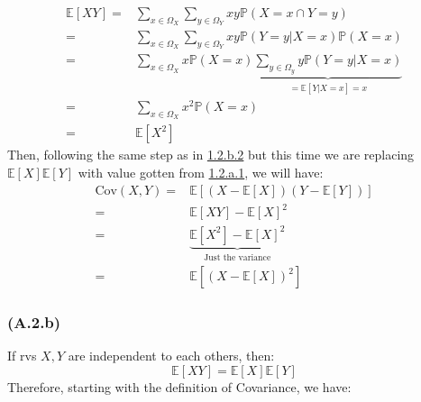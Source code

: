 \documentclass[]{article}
\begin{document}
            \begin{align*}\tag{1.2.a.1}\label{eqn:1.2.a.1}
                \mathbb{E}\left[XY\right] = 
                &\sum_{x\in\Omega_X}^{}
                    \sum_{y\in\Omega_Y}^{}
                        xy \mathbb{P}\left(X = x \cap Y = y\right)
                \\
                =&\sum_{x\in\Omega_X}^{}
                    \sum_{y\in\Omega_Y}^{}
                        xy \mathbb{P}\left(Y = y|X = x\right)\mathbb{P}\left(X = x\right)
                \\
                =&  \sum_{x\in\Omega_X}^{}
                    x \mathbb{P}\left(X = x\right)
                        \underbrace{
                            \sum_{y\in\Omega_y}^{}
                            y \mathbb{P}\left(Y = y|X = x\right)
                        }_
                        {=\mathbb{E}\left[Y| X = x\right] = x}
                \\
                =&  \sum_{x\in\Omega_X}^{}
                    x^2 \mathbb{P}\left(X = x\right)
                \\
                =& \mathbb{E}\left[X^2\right]
            \end{align*}
            Then, following the same step as in \hyperref[eqn:1.2.b.1]{1.2.b.2} but this time we are replacing $\mathbb{E}\left[X\right]\mathbb{E}\left[Y\right]$ with value gotten from \hyperref[eqn:1.2.a.1]{1.2.a.1}, we will have: 
            \begin{align*}\tag{1.2.a.2}\label{eqn:1.2.a.2}
                \text{Cov}(X, Y) =& \mathbb{E}\left[(X - \mathbb{E}\left[X\right])
                    ( Y - \mathbb{E}\left[Y\right])
                \right]
                \\
                =& 
                \mathbb{E}\left[XY\right] - \mathbb{E}\left[X\right]^2
                \\
                =&
                \underbrace
                {\mathbb{E}\left[X^2\right] - \mathbb{E}\left[X\right]^2}_
                {\text{Just the variance}}
                \\
                =&
                \mathbb{E}\left[(X - \mathbb{E}\left[X\right])^2\right]
            \end{align*}

        \subsubsection*{(A.2.b)}
            If rvs $X,Y$ are independent to each others, then: 
            \begin{equation*}\tag{1.2.b.1}\label{eqn:1.2.b.1}
                \mathbb{E}\left[XY\right] = \mathbb{E}\left[X\right]\mathbb{E}\left[Y\right]
            \end{equation*}
            Therefore, starting with the definition of Covariance, we have: 
\end{document}
